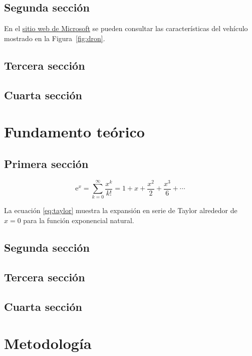 \documentclass[12pt]{Tesis}
\begin{document}
\section{Segunda sección}
\lipsum[3-4]
En el \href{http://www.microsoft.com}{sitio web de Microsoft} se pueden consultar las características del vehículo mostrado en la Figura~\ref{fig:dron}. 

\section{Tercera sección}
\lipsum[5-6]

\section{Cuarta sección}
\lipsum[7-8]

\chapter{Fundamento teórico}

\section{Primera sección}

\lipsum[1]

\begin{equation}                                                     
\mathrm{e}^{x} = \sum_{k=0}^{\infty} \frac{x^k}{k!} = 
1 + x + \frac{x^2}{2} + \frac{x^3}{6} + \cdots
\label{eq:taylor}
\end{equation}

La ecuación \eqref{eq:taylor} muestra la expansión en serie de Taylor alrededor de $x = 0$ para la función exponencial natural.

\section{Segunda sección}
\lipsum[3-4]

\section{Tercera sección}
\lipsum[5-6]

\section{Cuarta sección}
\lipsum[7-8]

\chapter{Metodología}
\end{document}
